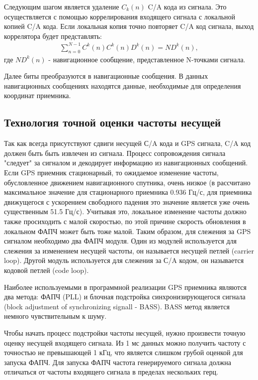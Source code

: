 Следующим шагом является удаление ${C_k(n)}$ C/A кода из сигнала. Это осуществляется с помощью коррелирования 
входящего сигнала с локальной копией C/A кода. Если локальная копия точно повторяет C/A код сигнала, 
выход коррелятора будет представлять:
\begin{eqnarray}
\sum_{n=0}^{N-1} C^k(n) C^k(n) D^k(n) = ND^k(n),
\end{eqnarray}
где ${ND^k(n)}$ - навигационное сообщение, представленное N-точками сигнала.

Далее биты преобразуются в навигационные сообщения. В данных навигационных сообщениях
находятся данные, необходимые для определения координат приемника.

\subsection{Технология точной оценки частоты несущей}
Так как всегда присутствуют сдвиги несущей С/A кода и GPS сигнала, C/A код должен быть быть извлечен из сигнала. Процесс сопровождения 
сигнала "следует" за сигналом и декодирует информацию из навигационных сообщений. Если GPS приемник стационарный, то ожидаемое
изменение частоты, обусловленное движением навигационного спутника, очень низкое (в \cite{tsui} рассчитано максимальное 
значение для стационарного
приемника 0.936 Гц/с, для приемника движущегося с ускорением свободного падения это значение является уже очень существенным 
51.5 Гц/с).
Учитывая это, локальное изменение частоты должно также просиходить с малой скоростью, по этой причине скорость обновления в
локальном ФАПЧ может быть тоже малой. Таким образом, для слежения за GPS сигналом необходимо два ФАПЧ модуля. Один из модулей
используется для слежения за изменением несущей частоты, он называется несущей петлей (carrier loop). Другой модуль 
используется для слежения за С/A кодом, он называется кодовой петлей (code loop).

Наиболее используемыми в программной реализации GPS приемника являются два метода: ФАПЧ (PLL) и блочная подстройка синхронизирующегося
сигнала (block adjustment of synchronizing signall - BASS). BASS метод является немного чувствительным к шуму.

Чтобы начать процесс подстройки частоты несущей, нужно произвести точную оценку несущей входящего сигнала.
Из 1 мс данных можно получить частоту с точностью не превышающей 1 кГц, что является слишком грубой оценкой
для запуска ФАПЧ. Для запуска ФАПЧ частота генерируемого сигнала должна отличаться от частоты входящего
сигнала в пределах нескольких герц.

